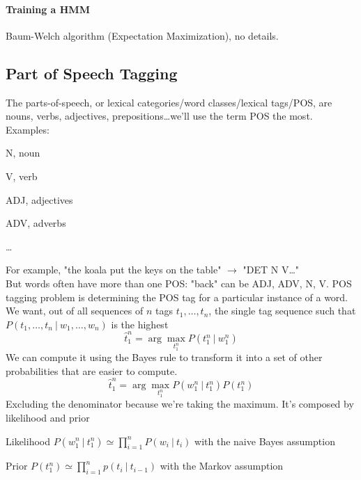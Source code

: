 \documentclass[10pt]{report}
\begin{document}
\paragraph{Training a HMM} Baum-Welch algorithm (Expectation Maximization), no details.
\subsection{Part of Speech Tagging} The parts-of-speech, or lexical categories/word classes/lexical tags/POS, are nouns, verbs, adjectives, prepositions\ldots we'll use the term POS the most. Examples:
\begin{list}{}{}
	\item N, noun
	\item V, verb
	\item ADJ, adjectives
	\item ADV, adverbs
	\item \ldots
\end{list}
For example, "the koala put the keys on the table" $\rightarrow$ "DET N V\ldots"\\
But words often have more than one POS: "back" can be ADJ, ADV, N, V. POS tagging problem is determining the POS tag for a particular instance of a word.\\
We want, out of all sequences of $n$ tags $t_1,\ldots,t_n$, the single tag sequence such that $P(t_1,\ldots,t_n\:|\:w_1,\ldots,w_n)$ is the highest $$\hat{t}_1^n=\arg\max_{t_1^n} P(t_1^n\:|\: w_1^n)$$
We can compute it using the Bayes rule to transform it into a set of other probabilities that are easier to compute.
$$\hat{t}_1^n=\arg\max_{t_1^n} P(w_1^n \:|\: t_1^n)P(t_1^n)$$
Excluding the denominator because we're taking the maximum. It's composed by likelihood and prior\begin{list}{}{}
	\item Likelihood $P(w_1^n \:|\: t_1^n) \simeq \prod_{i=1}^n P(w_i\:|\:t_i)$ with the naive Bayes assumption
	\item Prior $P(t_1^n)\simeq \prod_{i=1}^n p(t_i\:|\:t_{i-1})$ with the Markov assumption 
\end{list}
\end{document}

